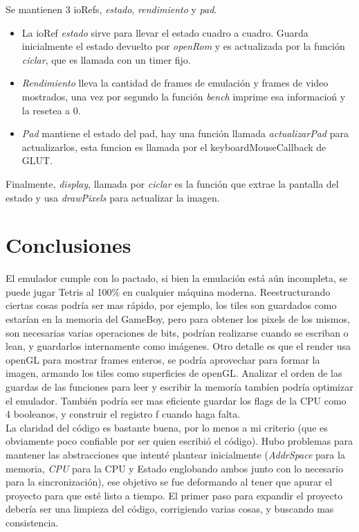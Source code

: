 \documentclass[a4paper,10pt]{report}
\begin{document}
Se mantienen 3 ioRefs, \textit{estado}, \textit{rendimiento} y \textit{pad}.\begin{itemize}
\item La ioRef \textit{estado} sirve para llevar el estado cuadro a cuadro. Guarda inicialmente el estado devuelto por \textit{openRom} y es actualizada por la función \textit{ciclar}, que es llamada con un timer fijo.\\
\item\textit{Rendimiento} lleva la cantidad de frames de emulación y frames de video mostrados, una vez por segundo la función \textit{bench} imprime esa informacioń y la resetea a 0.\\
\item\textit{Pad} mantiene el estado del pad, hay una función llamada \textit{actualizarPad} para actualizarlos, esta funcion es llamada por el keyboardMouseCallback de GLUT.\end{itemize}
Finalmente, \textit{display}, llamada por \textit{ciclar} es la función que extrae la pantalla del estado y usa \textit{drawPixels }para actualizar la imagen.
\clearpage
\section*{Conclusiones}
El emulador cumple con lo pactado, si bien la emulación está aún incompleta, se puede jugar Tetris al 100\% en cualquier máquina moderna. Reestructurando ciertas cosas podría ser mas rápido, por ejemplo, los tiles son guardados como estarían en la memoria del GameBoy, pero para obtener los pixels de los mismos, son necesarias varias operaciones de bits, podrían realizarse cuando se escriban o lean, y guardarlos internamente como imágenes. Otro detalle es que el render usa openGL para mostrar frames enteros, se podría aprovechar para formar la imagen, armando los tiles como superficies de openGL. Analizar el orden de las guardas de las funciones para leer y escribir la memoría tambíen podría optimizar el emulador. También podría ser mas eficiente guardar los flags de la CPU como 4 booleanos, y construir el registro f cuando haga falta.\\

La claridad del código es bastante buena, por lo menos a mi criterio (que es obviamente poco confiable por ser quien escribió el código). Hubo problemas para mantener las abstracciones que intenté plantear inicialmente (\textit{AddrSpace}  para la memoria, \textit{CPU} para la CPU y Estado englobando ambos junto con lo necesario para la sincronización), ese objetivo se fue deformando al tener que apurar el proyecto para que esté listo a tiempo. El primer paso para expandir el proyecto debería ser una limpieza del código, corrigiendo varias cosas, y buscando mas consistencia.
\end{document}
